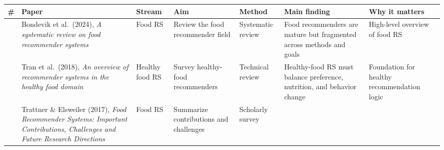 \documentclass[
  letterpaper,
  DIV=11,
  numbers=noendperiod]{scrartcl}
\newcounter{none} %
\begin{document}
{\def\LTcaptype{none} %
\begin{longtable}[]{@{}
  >{\raggedright\arraybackslash}p{}
  >{\raggedright\arraybackslash}p{}
  >{\raggedright\arraybackslash}p{}
  >{\raggedright\arraybackslash}p{}
  >{\raggedright\arraybackslash}p{}
  >{\raggedright\arraybackslash}p{}
  >{\raggedright\arraybackslash}p{}@{}}
\toprule\noalign{}
\begin{minipage}[b]{\linewidth}\raggedright
\#
\end{minipage} & \begin{minipage}[b]{\linewidth}\raggedright
Paper
\end{minipage} & \begin{minipage}[b]{\linewidth}\raggedright
Stream
\end{minipage} & \begin{minipage}[b]{\linewidth}\raggedright
Aim
\end{minipage} & \begin{minipage}[b]{\linewidth}\raggedright
Method
\end{minipage} & \begin{minipage}[b]{\linewidth}\raggedright
Main finding
\end{minipage} & \begin{minipage}[b]{\linewidth}\raggedright
Why it matters
\end{minipage} \\
\midrule\noalign{}
\endhead
\bottomrule\noalign{}
\endlastfoot
1 & Bondevik et al.~(2024), \emph{A systematic review on food
recommender systems} & Food RS & Review the food recommender field &
Systematic review & Food recommenders are mature but fragmented across
methods and goals & High-level overview of food RS \\
2 & Tran et al.~(2018), \emph{An overview of recommender systems in the
healthy food domain} & Healthy food RS & Survey healthy-food
recommenders & Technical review & Healthy-food RS must balance
preference, nutrition, and behavior change & Foundation for healthy
recommendation logic \\
3 & Trattner \& Elsweiler (2017), \emph{Food Recommender Systems:
Important Contributions, Challenges and Future Research Directions} &
Food RS & Summarize contributions and challenges & Scholarly survey &

\end{longtable}}
\end{document}
